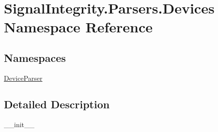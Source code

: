 \hypertarget{namespaceSignalIntegrity_1_1Parsers_1_1Devices}{}\section{Signal\+Integrity.\+Parsers.\+Devices Namespace Reference}
\label{namespaceSignalIntegrity_1_1Parsers_1_1Devices}
\subsection*{Namespaces}
\begin{DoxyCompactItemize}
\item 
 \hyperlink{namespaceSignalIntegrity_1_1Parsers_1_1Devices_1_1DeviceParser}{Device\+Parser}
\end{DoxyCompactItemize}


\subsection{Detailed Description}
\begin{DoxyVerb}__init__\end{DoxyVerb}
 